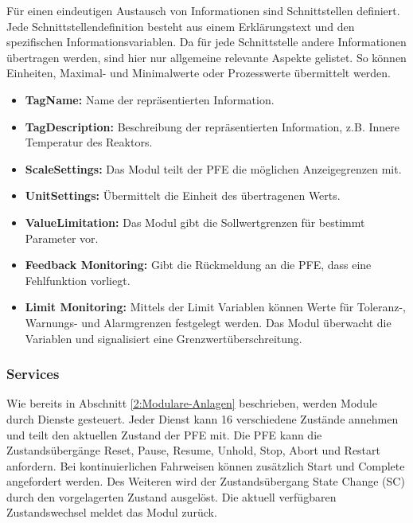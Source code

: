 Für einen eindeutigen Austausch von Informationen sind Schnittstellen definiert. Jede Schnittstellendefinition besteht aus einem Erklärungstext und den spezifischen Informationsvariablen. Da für jede Schnittstelle andere Informationen übertragen werden, sind hier nur allgemeine relevante Aspekte gelistet. So können Einheiten, Maximal- und Minimalwerte oder Prozesswerte übermittelt werden.
\begin{itemize}
\item \textbf{TagName:} Name der repräsentierten Information. 
\item \textbf{TagDescription:} Beschreibung der repräsentierten Information, z.B. Innere Temperatur des Reaktors.
\item \textbf{ScaleSettings:} Das Modul teilt der PFE die möglichen Anzeigegrenzen mit.
\item \textbf{UnitSettings:} Übermittelt die Einheit des übertragenen Werts.
\item \textbf{ValueLimitation:} Das Modul gibt die Sollwertgrenzen für bestimmt Parameter vor.
\item \textbf{Feedback Monitoring:} Gibt die Rückmeldung an die PFE, dass eine Fehlfunktion vorliegt.
\item \textbf{Limit Monitoring:} Mittels der Limit Variablen können Werte für Toleranz-, Warnungs- und Alarmgrenzen festgelegt werden. Das Modul überwacht die Variablen und signalisiert eine Grenzwertüberschreitung.
\end{itemize}

\subsubsection{Services}
Wie bereits in Abschnitt \ref{2:Modulare-Anlagen} beschrieben, werden Module durch Dienste gesteuert. Jeder Dienst kann 16 verschiedene Zustände annehmen und teilt den aktuellen Zustand der PFE mit. Die PFE kann die Zustandsübergänge Reset, Pause, Resume, Unhold, Stop, Abort und Restart anfordern. Bei kontinuierlichen Fahrweisen können zusätzlich Start und Complete angefordert werden. Des Weiteren wird der Zustandsübergang State Change (SC) durch den vorgelagerten Zustand ausgelöst.  Die aktuell verfügbaren Zustandswechsel meldet das Modul zurück.

